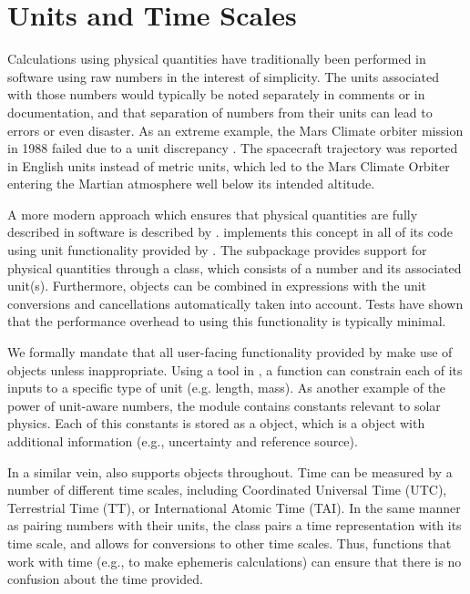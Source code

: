 \section{Units and Time Scales}
\label{sec:units}

Calculations using physical quantities have traditionally been performed in software using raw numbers in the interest of simplicity.
The units associated with those numbers would typically be noted separately in comments or in documentation, and that separation of numbers from their units can lead to errors or even disaster.
As an extreme example, the Mars Climate orbiter mission in 1988 failed due to a unit discrepancy \citep{mco_mishap_report}.
The spacecraft trajectory was reported in English units instead of metric units, which led to the Mars Climate Orbiter entering the Martian atmosphere well below its intended altitude.

A more modern approach which ensures that physical quantities are fully described in software is described by \citet{Damevski2009}.
\sunpypkg implements this concept in all of its code using unit functionality provided by \astropy.
The  subpackage provides support for physical quantities through a  class, which consists of a number and its associated unit(s).
Furthermore,  objects can be combined in expressions with the unit conversions and cancellations automatically taken into account.
Tests have shown that the performance overhead to using this functionality is typically minimal.

We formally mandate that all user-facing functionality provided by \sunpypkg make use of  objects unless inappropriate.
Using a tool in , a function can constrain each of its inputs to a specific type of unit (e.g. length, mass).
As another example of the power of unit-aware numbers, the  module contains constants relevant to solar physics.
Each of this constants is stored as a  object, which is a  object with additional information (e.g., uncertainty and reference source).

In a similar vein, \sunpy also supports  objects throughout.
Time can be measured by a number of different time scales, including Coordinated Universal Time (UTC), Terrestrial Time (TT), or International Atomic Time (TAI).
In the same manner as pairing numbers with their units, the  class pairs a time representation with its time scale, and allows for conversions to other time scales.
Thus, functions that work with time (e.g., to make ephemeris calculations) can ensure that there is no confusion about the time provided.
